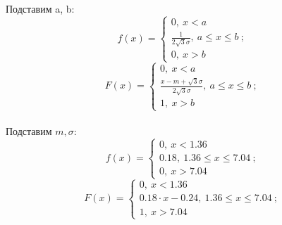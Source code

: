 \documentclass{article}
\begin{document}
Подставим a, b:
\[f(x) = 
\begin{cases}
    0,\ x<a\\
    \frac{1}{2\sqrt{3}\sigma},\ a\leq x\leq b\ ;\\
    0,\ x>b
\end{cases}
\] 
\[F(x) = 
\begin{cases}
    0,\ x<a\\
    \frac{x-m+\sqrt{3}\sigma}{2\sqrt{3}\sigma},\ a\leq x\leq b\ ;\\
    1,\ x>b
\end{cases}
\]
\\
Подставим $m, \sigma:$
\[f(x) = 
\begin{cases}
    0,\ x<1.36\\
    0.18,\ 1.36\leq x\leq 7.04\ ;\\
    0,\ x>7.04
\end{cases}
\] 
\[F(x) = 
\begin{cases}
    0,\ x<1.36\\
    0.18\cdot x- 0.24,\ 1.36\leq x\leq 7.04\ ;\\
    1,\ x>7.04
\end{cases}
\]
\newpage
\end{document}
